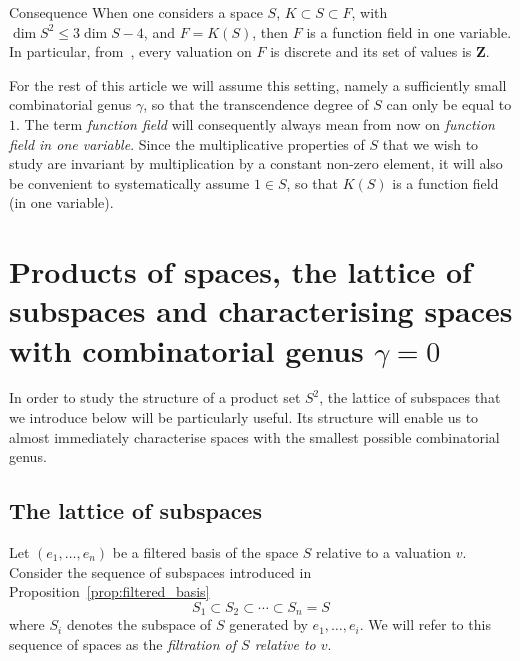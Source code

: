 \documentclass[ALCO,Unicode,ThmDefs]{cedram}
\newcommand*\Z{{\mathbf Z}}
\renewcommand{\leq}{\leqslant}
\begin{document}
\begin{enonce*}[remark]{Consequence}
When one considers a space $S$, $K\subset S \subset F$, with $\dim S^2\leq3\dim S - 4$, and $F= K(S)$, then $F$ is a function field in one variable. In particular, from~\cite[Theorem~1.1.16]{Stichtenoth}, every valuation on $F$ is discrete and its set of values is $\Z$.
\end{enonce*}

For the rest of this article we will assume this setting, namely a sufficiently small combinatorial genus $\gamma$, so that the transcendence degree of $S$ can only be equal to $1$. The term \emph{function field} will consequently always mean from now on \emph{function field in one variable}. Since the multiplicative properties of $S$ that we wish to study are invariant by multiplication by a constant non-zero element, it will also be convenient to systematically assume $1\in S$, so that $K(S)$ is a function field (in one variable).


\section{Products of spaces, the lattice of subspaces and characterising spaces with combinatorial genus \texorpdfstring{$\gamma=0$}{gamma=0}}\label{sec:products}

In order to study the structure of a product set $S^2$, the lattice of subspaces that we introduce below will be particularly useful. Its structure will enable us to almost immediately characterise spaces with the smallest possible combinatorial genus.

\subsection{The lattice of subspaces}\label{sec:lattice}

Let $(e_1,\ldots,e_n)$ be a filtered basis of the space $S$ relative to a valuation $v$. Consider the sequence of subspaces {introduced in Proposition~\ref{prop:filtered_basis}}
\[
S_1\subset S_2\subset\cdots \subset S_n=S
\]
where $S_i$ denotes the subspace of $S$ generated by $e_1,\ldots ,e_i$. We will refer to this sequence of spaces as the \emph{filtration of $S$ relative to $v$}.
\end{document}
